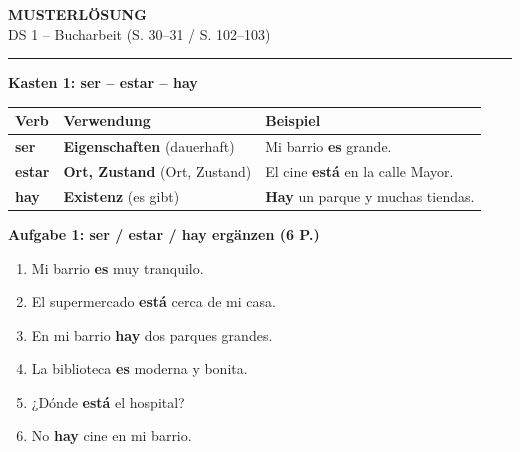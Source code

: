 \documentclass[11pt,a4paper]{article}
\newcommand{\lsg}[1]{\textcolor{loesung}{\textbf{#1}}}
\begin{document}
\begin{center}
{\Large\textbf{\textcolor{loesung}{MUSTERLÖSUNG}}}\\[0.3em]
{\large DS 1 -- Bucharbeit (S. 30--31 / S. 102--103)}
\end{center}

\vspace{0.5em}
\hrule
\vspace{1em}

\begin{gruppenbox}

\textbf{Kasten 1: ser -- estar -- hay}

\begin{tabularx}{\textwidth}{@{}|p{2.5cm}|X|X|@{}}
\hline
\textbf{Verb} & \textbf{Verwendung} & \textbf{Beispiel} \\
\hline
\textbf{ser} & \lsg{Eigenschaften} (dauerhaft) & Mi barrio \lsg{es} grande. \\
\hline
\textbf{estar} & \lsg{Ort, Zustand} (Ort, Zustand) & El cine \lsg{está} en la calle Mayor. \\
\hline
\textbf{hay} & \lsg{Existenz} (es gibt) & \lsg{Hay} un parque y muchas tiendas. \\
\hline
\end{tabularx}

\vspace{0.8em}

\textbf{Aufgabe 1: ser / estar / hay ergänzen (6 P.)}
\begin{enumerate}[label=\alph*), leftmargin=2em, nosep]
    \item Mi barrio \lsg{es} muy tranquilo.
    \item El supermercado \lsg{está} cerca de mi casa.
    \item En mi barrio \lsg{hay} dos parques grandes.
    \item La biblioteca \lsg{es} moderna y bonita.
    \item ¿Dónde \lsg{está} el hospital?
    \item No \lsg{hay} cine en mi barrio.
\end{enumerate}

\vspace{0.5em}


\end{gruppenbox}
\end{document}
